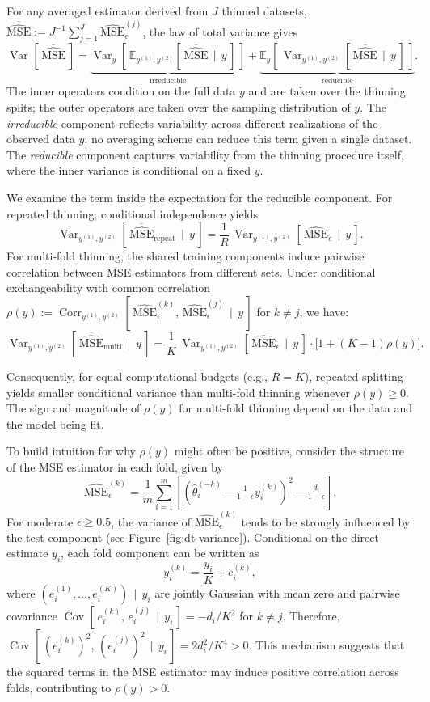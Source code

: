 \documentclass[11pt]{article}
\newcommand{\given}{\,\mid\,}
\newcommand{\ytrain}{y^{(1)}}                           %
\newcommand{\ytest}{y^{(2)}}                            %
\newcommand{\msehat}{\widehat{\mathrm{MSE}}_{\epsilon}}
\newcommand{\msebar}{\overline{\widehat{\mathrm{MSE}}}}
\newcommand{\E}[2][]{\mathbb{E}_{#1}\!\left[\,#2\,\right]}
\newcommand{\Var}[2][]{\operatorname{Var}_{#1}\!\left[\,#2\,\right]}
\newcommand{\Cov}[3][]{\operatorname{Cov}_{#1}\!\left[\,#2,\,#3\,\right]}
\newcommand{\Corr}[3][]{\operatorname{Corr}_{#1}\!\left[\,#2,\,#3\,\right]}
\theoremstyle{plain}
\theoremstyle{definition}
\theoremstyle{remark}
\begin{document}
For any averaged estimator derived from $J$ thinned datasets, $\msebar := J^{-1} \sum_{j=1}^J \msehat^{(j)}$, the law of total variance gives
\[
\Var{\msebar} = \underbrace{\Var[y]{\E[\ytrain, \ytest]{\msebar \given y}}}_{\text{irreducible}} + \underbrace{\E[y]{\Var[\ytrain, \ytest]{\msebar \given y}}}_{\text{reducible}}.
\]
The inner operators condition on the full data $y$ and are taken over the thinning splits; the outer operators are taken over the sampling distribution of $y$. The \emph{irreducible} component reflects variability across different realizations of the observed data $y$: no averaging scheme can reduce this term given a single dataset. The \emph{reducible} component captures variability from the thinning procedure itself, where the inner variance is conditional on a fixed $y$.

We examine the term inside the expectation for the reducible component. For repeated thinning, conditional independence yields
\[
\Var[\ytrain, \ytest]{\msebar_{\mathrm{repeat}} \given y} = \frac{1}{R} \, \Var[\ytrain, \ytest]{\msehat \given y}.
\]
For multi-fold thinning, the shared training components induce pairwise correlation between MSE estimators from different sets. Under conditional exchangeability with common correlation $\rho(y) := \Corr[\ytrain, \ytest]{\msehat^{(k)}}{\msehat^{(j)} \given y}$ for $k \neq j$, we have:
\[
\Var[\ytrain, \ytest]{\msebar_{\mathrm{multi}} \given y} = \frac{1}{K} \, \Var[\ytrain, \ytest]{\msehat \given y} \cdot \big[1 + (K-1) \rho(y) \big].
\]


Consequently, for equal computational budgets (e.g., $R=K$), repeated splitting yields smaller conditional variance than multi-fold thinning whenever $\rho(y) \ge 0$. The sign and magnitude of $\rho(y)$ for multi-fold thinning depend on the data and the model being fit.

To build intuition for why $\rho(y)$ might often be positive, consider the structure of the MSE estimator in each fold, given by
\[
\msehat^{(k)} = \frac{1}{m}\sum_{i=1}^m \left[ \left( \hat{\theta}^{(-k)}_i - \tfrac{1}{1-\epsilon}y^{(k)}_i \right)^{\!2} - \tfrac{d_i}{1-\epsilon} \right].
\]
For moderate $\epsilon \geq 0.5$, the variance of $\msehat^{(k)}$ tends to be strongly influenced by the test component (see Figure~\ref{fig:dt-variance}). Conditional on the direct estimate $y_i$, each fold component can be written as
\[
y_i^{(k)} = \frac{y_i}{K} + e_i^{(k)},
\]
where $(e_i^{(1)},\ldots,e_i^{(K)}) \given y_i$ are jointly Gaussian with mean zero and pairwise covariance $\Cov{e_i^{(k)}}{e_i^{(j)} \given y_i} = -d_i/K^2$ for $k \neq j$.
Therefore, $\Cov{(e_i^{(k)})^2}{(e_i^{(j)})^2 \given y_i} = 2d_i^2/K^4 > 0$.
This mechanism suggests that the squared terms in the MSE estimator may induce positive correlation across folds, contributing to $\rho(y) > 0$.
\end{document}
